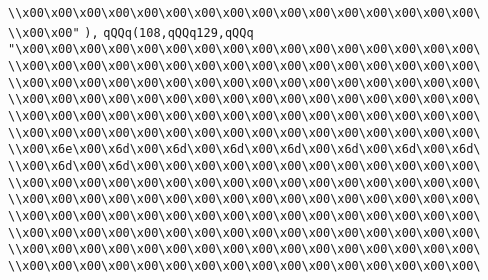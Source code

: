 \verb|\\x00\x00\x00\x00\x00\x00\x00\x00\x00\x00\x00\x00\x00\x00\x00\x00\|\newline
\verb|\\x00\x00"|\newline
\verb|),|\newline
\verb|qQQq(108,qQQq129,qQQq|\newline
\verb|"\x00\x00\x00\x00\x00\x00\x00\x00\x00\x00\x00\x00\x00\x00\x00\x00\|\newline
\verb|\\x00\x00\x00\x00\x00\x00\x00\x00\x00\x00\x00\x00\x00\x00\x00\x00\|\newline
\verb|\\x00\x00\x00\x00\x00\x00\x00\x00\x00\x00\x00\x00\x00\x00\x00\x00\|\newline
\verb|\\x00\x00\x00\x00\x00\x00\x00\x00\x00\x00\x00\x00\x00\x00\x00\x00\|\newline
\verb|\\x00\x00\x00\x00\x00\x00\x00\x00\x00\x00\x00\x00\x00\x00\x00\x00\|\newline
\verb|\\x00\x00\x00\x00\x00\x00\x00\x00\x00\x00\x00\x00\x00\x00\x00\x00\|\newline
\verb|\\x00\x6e\x00\x6d\x00\x6d\x00\x6d\x00\x6d\x00\x6d\x00\x6d\x00\x6d\|\newline
\verb|\\x00\x6d\x00\x6d\x00\x00\x00\x00\x00\x00\x00\x00\x00\x00\x00\x00\|\newline
\verb|\\x00\x00\x00\x00\x00\x00\x00\x00\x00\x00\x00\x00\x00\x00\x00\x00\|\newline
\verb|\\x00\x00\x00\x00\x00\x00\x00\x00\x00\x00\x00\x00\x00\x00\x00\x00\|\newline
\verb|\\x00\x00\x00\x00\x00\x00\x00\x00\x00\x00\x00\x00\x00\x00\x00\x00\|\newline
\verb|\\x00\x00\x00\x00\x00\x00\x00\x00\x00\x00\x00\x00\x00\x00\x00\x00\|\newline
\verb|\\x00\x00\x00\x00\x00\x00\x00\x00\x00\x00\x00\x00\x00\x00\x00\x00\|\newline
\verb|\\x00\x00\x00\x00\x00\x00\x00\x00\x00\x00\x00\x00\x00\x00\x00\x00\|\newline
